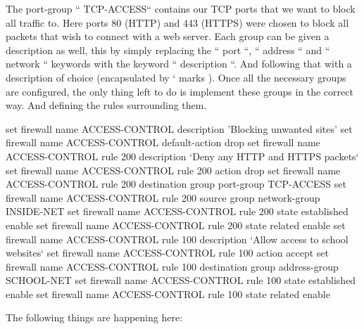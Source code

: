 The port-group `` TCP-ACCESS`` contains our TCP ports that we want to block all traffic to. Here ports 80 (HTTP) and 443 (HTTPS) were chosen to block all packets that wish to connect with a web server. Each group can be given a description as well, this by simply replacing the `` port ``, `` address `` and `` network `` keywords with the keyword `` description ``.  And following that with a description of choice (encapsulated by ` marks ). Once all the necessary groups are configured, the only thing left to do is implement these groups in the correct way. And defining the rules surrounding them.\\
\begin{cisco}[title= Configuring the firewall rules]
set firewall name ACCESS-CONTROL description 'Blocking unwanted sites'
set firewall name ACCESS-CONTROL default-action drop
set firewall name ACCESS-CONTROL rule 200 description `Deny any HTTP and HTTPS packets`
set firewall name ACCESS-CONTROL rule 200 action drop
set firewall name ACCESS-CONTROL rule 200 destination group port-group TCP-ACCESS
set firewall name ACCESS-CONTROL rule 200 source group network-group INSIDE-NET
set firewall name ACCESS-CONTROL rule 200 state established enable
set firewall name ACCESS-CONTROL rule 200 state related enable
set firewall name ACCESS-CONTROL rule 100 description `Allow access to school websites`
set firewall name ACCESS-CONTROL rule 100 action accept
set firewall name ACCESS-CONTROL rule 100 destination group address-group SCHOOL-NET
set firewall name ACCESS-CONTROL rule 100 state established enable
set firewall name ACCESS-CONTROL rule 100 state related enable
\end{cisco}
The following things are happening here:
